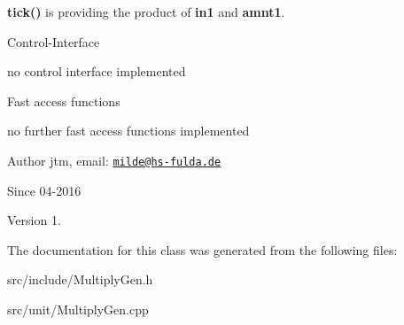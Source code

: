 \begin{DoxyItemize}
\item {\bfseries tick()} is providing the product of {\bfseries in1} and {\bfseries amnt1}.
\end{DoxyItemize}

Control-\/\-Interface
\begin{DoxyItemize}
\item no control interface implemented
\end{DoxyItemize}

Fast access functions
\begin{DoxyItemize}
\item no further fast access functions implemented
\end{DoxyItemize}

\begin{DoxyAuthor}{Author}
jtm, email\-:  \href{mailto:milde@hs-fulda.de}{\tt milde@hs-\/fulda.\-de} 
\end{DoxyAuthor}
\begin{DoxySince}{Since}
04-\/2016 
\end{DoxySince}
\begin{DoxyVersion}{Version}
1. 
\end{DoxyVersion}


The documentation for this class was generated from the following files\-:\begin{DoxyCompactItemize}
\item 
src/include/Multiply\-Gen.\-h\item 
src/unit/Multiply\-Gen.\-cpp\end{DoxyCompactItemize}
